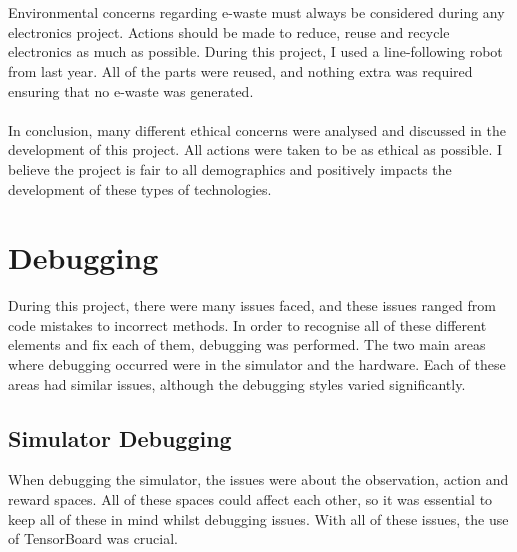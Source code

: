 \documentclass[a4paper,12pt]{article}
\begin{document}
\\\\
Environmental concerns regarding e-waste must always be considered during any electronics project. Actions should be made to reduce, reuse and recycle electronics as much as possible. During this project, I used a line-following robot from last year. All of the parts were reused, and nothing extra was required ensuring that no e-waste was generated. 
\\\\
In conclusion, many different ethical concerns were analysed and discussed in the development of this project. All actions were taken to be as ethical as possible. I believe the project is fair to all demographics and positively impacts the development of these types of technologies. 


\section{Debugging}
During this project, there were many issues faced, and these issues ranged from code mistakes to incorrect methods. In order to recognise all of these different elements and fix each of them, debugging was performed. The two main areas where debugging occurred were in the simulator and the hardware. Each of these areas had similar issues, although the debugging styles varied significantly.

\subsection{Simulator Debugging}
When debugging the simulator, the issues were about the observation, action and reward spaces. All of these spaces could affect each other, so it was essential to keep all of these in mind whilst debugging issues. With all of these issues, the use of TensorBoard was crucial. 
\end{document}
